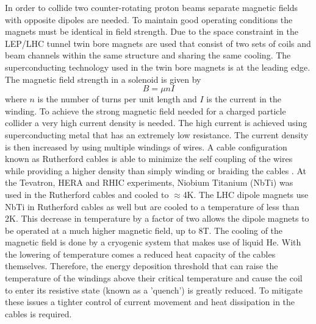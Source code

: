 In order to collide two counter-rotating proton beams separate magnetic fields
with opposite dipoles are needed. To maintain good operating conditions
the magnets must be identical in field strength. 
Due to the space constraint in the LEP/LHC
tunnel twin bore magnets are used that consist of two sets of 
coils and beam channels within the same structure and
sharing the same cooling. 
The superconducting technology used in the twin bore magnets is at the leading edge.
The magnetic field strength in a solenoid is given by  
\begin{equation}
B=\mu nI
\end{equation}
where $n$ is the number of turns per unit length and $I$ is the current in the winding.
To achieve the strong magnetic field needed for a charged particle collider
a very high current density is needed. 
The high current is achieved using superconducting
metal that has an extremely low resistance.
The current density is then increased by using multiple windings of 
wires. A cable configuration known as Rutherford cables is able to
minimize the self coupling of the wires while providing a higher density
than simply winding or braiding the cables \cite{WilsonSuperCond}.
At the Tevatron, HERA and RHIC experiments, Niobium Titanium (NbTi)
was used in the Rutherford cables and cooled to $\approx$4K. 
The LHC dipole magnets use NbTi in Rutherford cables as well but are cooled
to a temperature of less than 2K. 
This decrease in temperature
by a factor of two allows the dipole magnets to be operated 
at a much higher magnetic field, up to 8T. 
The cooling of the magnetic field is done 
by a cryogenic system that makes use of liquid He. With the lowering of
temperature comes a reduced heat capacity of the cables themselves.
Therefore, the energy deposition threshold that can raise the 
temperature of the windings above their critical temperature and
cause the coil to enter its resistive state (known as a 'quench') is greatly
reduced. To mitigate these issues a tighter control of current movement
and heat dissipation in the cables is required. 
%


